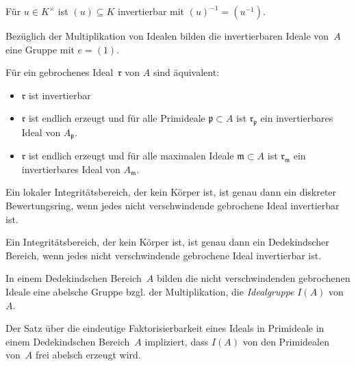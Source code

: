 \documentclass{cheat-sheet}
\newcommand{\ppp}{\mathfrak{p}}
\newcommand{\rrr}{\mathfrak{r}}
\newcommand{\mmm}{\mathfrak{m}}
\begin{document}
\begin{bsp}
  Für $u \in K^{\times}$ ist $(u) \subseteq K$ invertierbar mit $(u)^{-1} = (u^{-1})$.
\end{bsp}

\begin{bem}
  Bezüglich der Multiplikation von Idealen bilden die invertierbaren Ideale von~$A$ eine Gruppe mit $e = (1)$.
\end{bem}

\begin{prop}
  Für ein gebrochenes Ideal~$\rrr$ von $A$ sind äquivalent:
  \begin{itemize}
    \item $\rrr$ ist invertierbar
    \item $\rrr$ ist endlich erzeugt und für alle Primideale $\ppp \subset A$ ist $\rrr_\ppp$ ein invertierbares Ideal von $A_\ppp$.
    \item $\rrr$ ist endlich erzeugt und für alle maximalen Ideale $\mmm \subset A$ ist $\rrr_\mmm$ ein invertierbares Ideal von $A_\mmm$.
  \end{itemize}
\end{prop}


\begin{prop}
  Ein lokaler Integritätsbereich, der kein Körper ist, ist genau dann ein diskreter Bewertungsring, wenn jedes nicht verschwindende gebrochene Ideal invertierbar ist.
\end{prop}

\begin{satz}
  Ein Integritätsbereich, der kein Körper ist, ist genau dann ein Dedekindscher Bereich, wenn jedes nicht verschwindende gebrochene Ideal invertierbar ist.
\end{satz}


\begin{kor}
  In einem Dedekindschen Bereich~$A$ bilden die nicht verschwindenden gebrochenen Ideale eine abelsche Gruppe bzgl. der Multiplikation, die \emph{Idealgruppe} $I(A)$ von~$A$.
\end{kor}

\begin{bem}
  Der Satz über die eindeutige Faktorisierbarkeit eines Ideals in Primideale in einem Dedekindschen Bereich~$A$ impliziert, dass $I(A)$ von den Primidealen von~$A$ frei abelsch erzeugt wird.
\end{bem}
\end{document}
